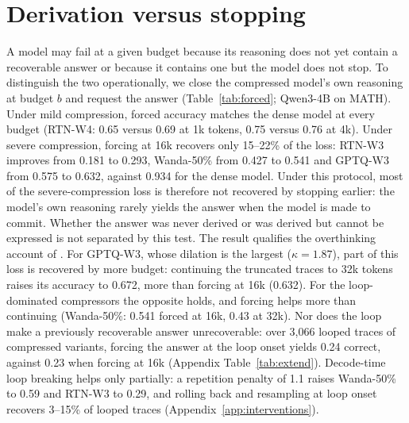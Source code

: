\documentclass[10pt]{article}
\begin{document}
\begin{table}[t]
  \centering\scriptsize\setlength{\tabcolsep}{2pt}
  \caption{How models fail on MATH-500 (16k budget), sorted by accuracy: accuracy, truncated share of all traces, and share of errors that did not terminate (non-term./err.), split into loops and long traces without a loop (95\% bootstrap CIs over problems). GPQA, BIG-Bench Hard and the R1-Distill family are in Appendix Table~\ref{tab:failuremore}.}
  \label{tab:failure}
\end{table}

\section{Derivation versus stopping}
\label{sec:forced}

\begin{table}[t]
  \centering\small\setlength{\tabcolsep}{2.5pt}
  \caption{Natural vs.\ forced accuracy at reasoning budget $b$ (Qwen3-4B, MATH-500). ``Natural'' counts traces that finished within $b$ with a correct answer; ``forced'' closes the model's own reasoning at $b$ and requests the answer.}
  \label{tab:forced}
\end{table}

A model may fail at a given budget because its reasoning does not yet contain a recoverable answer or because it contains one but the model does not stop. To distinguish the two operationally, we close the compressed model's own reasoning at budget $b$ and request the answer (Table~\ref{tab:forced}; Qwen3-4B on MATH). Under mild compression, forced accuracy matches the dense model at every budget (RTN-W4: 0.65 versus 0.69 at 1k tokens, 0.75 versus 0.76 at 4k). Under severe compression, forcing at 16k recovers only 15--22\% of the loss: RTN-W3 improves from 0.181 to 0.293, Wanda-50\% from 0.427 to 0.541 and GPTQ-W3 from 0.575 to 0.632, against 0.934 for the dense model. Under this protocol, most of the severe-compression loss is therefore not recovered by stopping earlier: the model's own reasoning rarely yields the answer when the model is made to commit. Whether the answer was never derived or was derived but cannot be expressed is not separated by this test. The result qualifies the overthinking account of \citet{lotfi2026quantized}. For GPTQ-W3, whose dilation is the largest ($\kappa=1.87$), part of this loss is recovered by more budget: continuing the truncated traces to 32k tokens raises its accuracy to 0.672, more than forcing at 16k (0.632). For the loop-dominated compressors the opposite holds, and forcing helps more than continuing (Wanda-50\%: 0.541 forced at 16k, 0.43 at 32k). Nor does the loop make a previously recoverable answer unrecoverable: over 3,066 looped traces of compressed variants, forcing the answer at the loop onset yields 0.24 correct, against 0.23 when forcing at 16k (Appendix Table~\ref{tab:extend}). Decode-time loop breaking helps only partially: a repetition penalty of 1.1 raises Wanda-50\% to 0.59 and RTN-W3 to 0.29, and rolling back and resampling at loop onset recovers 3--15\% of looped traces (Appendix~\ref{app:interventions}).
\end{document}
